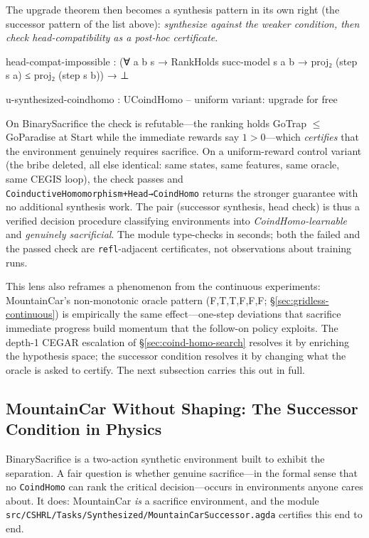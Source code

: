 \documentclass[9pt,a4paper]{article}
\newcommand{\fpath}[1]{\nolinkurl{#1}}
\theoremstyle{plain}
\theoremstyle{definition}
\theoremstyle{remark}
\begin{document}
The upgrade theorem then becomes a synthesis pattern in its own right (the successor pattern of the list above): \emph{synthesize against the weaker condition, then check head-compatibility as a post-hoc certificate}.
\begin{spec}
head-compat-impossible : (∀ a b s → RankHolds succ-model s a b →
                          proj₂ (step s a) ≤ proj₂ (step s b)) → ⊥

u-synthesized-coindhomo : UCoindHomo   -- uniform variant: upgrade for free
\end{spec}
On BinarySacrifice the check is refutable---the ranking holds GoTrap $\le$ GoParadise at Start while the immediate rewards say $1 > 0$---which \emph{certifies} that the environment genuinely requires sacrifice.  On a uniform-reward control variant (the bribe deleted, all else identical: same states, same features, same oracle, same CEGIS loop), the check passes and \texttt{CoinductiveHomomorphism+Head→CoindHomo} returns the stronger guarantee with no additional synthesis work.  The pair (successor synthesis, head check) is thus a verified decision procedure classifying environments into \emph{CoindHomo-learnable} and \emph{genuinely sacrificial}.  The module type-checks in seconds; both the failed and the passed check are \texttt{refl}-adjacent certificates, not observations about training runs.

This lens also reframes a phenomenon from the continuous experiments: MountainCar's non-monotonic oracle pattern (F,T,T,F,F,F; \S\ref{sec:gridless-continuous}) is empirically the same effect---one-step deviations that sacrifice immediate progress build momentum that the follow-on policy exploits.  The depth-1 CEGAR escalation of \S\ref{sec:coind-homo-search} resolves it by enriching the hypothesis space; the successor condition resolves it by changing what the oracle is asked to certify.  The next subsection carries this out in full.

\subsection{MountainCar Without Shaping: The Successor Condition in Physics}
\label{sec:mc-successor}

BinarySacrifice is a two-action synthetic environment built to exhibit the separation.  A fair question is whether genuine sacrifice---in the formal sense that no \texttt{CoindHomo} can rank the critical decision---occurs in environments anyone cares about.  It does: MountainCar \emph{is} a sacrifice environment, and the module \fpath{src/CSHRL/Tasks/Synthesized/MountainCarSuccessor.agda} certifies this end to end.
\end{document}
